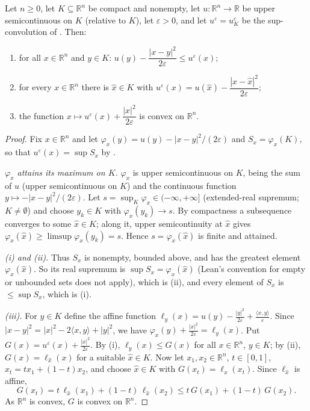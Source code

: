 \begin{lemma}
Let $n\ge0$, let $K\subseteq\mathbb R^n$ be compact and nonempty, let $u:\mathbb R^n\to\mathbb R$ be upper semicontinuous on $K$ (relative to $K$), let $\varepsilon>0$, and let $u^\varepsilon=u^\varepsilon_K$ be the sup-convolution of . Then:
\begin{enumerate}
\item[(i)] for all $x\in\mathbb R^n$ and $y\in K$: $u(y)-\dfrac{|x-y|^2}{2\varepsilon}\le u^\varepsilon(x)$;
\item[(ii)] for every $x\in\mathbb R^n$ there is $\hat x\in K$ with $u^\varepsilon(x)=u(\hat x)-\dfrac{|x-\hat x|^2}{2\varepsilon}$;
\item[(iii)] the function $x\mapsto u^\varepsilon(x)+\dfrac{|x|^2}{2\varepsilon}$ is convex on $\mathbb R^n$.
\end{enumerate}
\end{lemma}
\begin{proof}
Fix $x\in\mathbb R^n$ and let $\varphi_x(y)=u(y)-|x-y|^2/(2\varepsilon)$ and $S_x=\varphi_x(K)$, so that $u^\varepsilon(x)=\sup S_x$ by .

\emph{$\varphi_x$ attains its maximum on $K$.} $\varphi_x$ is upper semicontinuous on $K$, being the sum of $u$ (upper semicontinuous on $K$) and the continuous function $y\mapsto-|x-y|^2/(2\varepsilon)$. Let $s=\sup_K\varphi_x\in(-\infty,+\infty]$ (extended-real supremum; $K\neq\emptyset$) and choose $y_k\in K$ with $\varphi_x(y_k)\to s$. By compactness a subsequence converges to some $\hat x\in K$; along it, upper semicontinuity at $\hat x$ gives $\varphi_x(\hat x)\ge\limsup\varphi_x(y_k)=s$. Hence $s=\varphi_x(\hat x)$ is finite and attained.

\emph{(i) and (ii).} Thus $S_x$ is nonempty, bounded above, and has the greatest element $\varphi_x(\hat x)$. So its real supremum is $\sup S_x=\varphi_x(\hat x)$ (Lean's convention for empty or unbounded sets does not apply), which is (ii), and every element of $S_x$ is $\le\sup S_x$, which is (i).

\emph{(iii).} For $y\in K$ define the affine function $\ell_y(x)=u(y)-\frac{|y|^2}{2\varepsilon}+\frac{\langle x,y\rangle}{\varepsilon}$. Since $|x-y|^2=|x|^2-2\langle x,y\rangle+|y|^2$, we have $\varphi_x(y)+\frac{|x|^2}{2\varepsilon}=\ell_y(x)$. Put $G(x)=u^\varepsilon(x)+\frac{|x|^2}{2\varepsilon}$. By (i), $\ell_y(x)\le G(x)$ for all $x\in\mathbb R^n$, $y\in K$; by (ii), $G(x)=\ell_{\hat x}(x)$ for a suitable $\hat x\in K$. Now let $x_1,x_2\in\mathbb R^n$, $t\in[0,1]$, $x_t=tx_1+(1-t)x_2$, and choose $\hat x\in K$ with $G(x_t)=\ell_{\hat x}(x_t)$. Since $\ell_{\hat x}$ is affine,
\[
G(x_t)=t\,\ell_{\hat x}(x_1)+(1-t)\,\ell_{\hat x}(x_2)\le t\,G(x_1)+(1-t)\,G(x_2).
\]
As $\mathbb R^n$ is convex, $G$ is convex on $\mathbb R^n$.
\end{proof}
